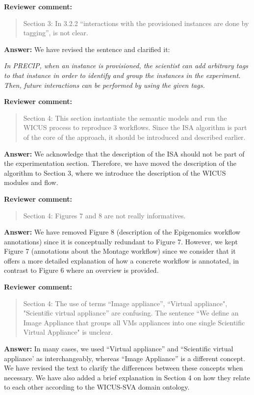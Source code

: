 \documentclass{letter}
\newenvironment{review}%
{\textbf{Reviewer comment:}\begin{quote}}%
{\end{quote}}%
\newcommand{\answer}[1]{%
      \textbf{Answer:} #1}
\newcommand{\revised}[1]{\emph{#1}\color{black}}
\begin{document}
\begin{letter}{}
\begin{review}
Section 3: In 3.2.2 ``interactions with the provisioned instances are done by tagging'', is not clear.
\end{review}

\answer{We have revised the sentence and clarified it:}

\revised{In PRECIP, when an instance is provisioned, the scientist can add arbitrary tags to that instance in order to identify and group the instances in the experiment. Then, future interactions can be performed by using the given tags.}


\begin{review}
Section 4: This section instantiate the semantic models and run the WICUS process to reproduce 3 workflows. Since the ISA algorithm is part of the core of the approach, it should be introduced and described earlier.
\end{review}

\answer{We acknowledge that the description of the ISA should not be part of the experimentation section. Therefore, we have moved the description of the algorithm to Section 3, where we introduce the description of the WICUS modules and flow.}


\begin{review}
Section 4: Figures 7 and 8 are not really informatives.
\end{review}

\answer{We have removed Figure 8 (description of the Epigenomics workflow annotations) since it is conceptually redundant to Figure 7. However, we kept Figure 7 (annotations about the Montage workflow) since we consider that it offers a more detailed explanation of how a concrete workflow is annotated, in contrast to Figure 6 where an overview is provided.}


\begin{review}
Section 4: The use of terms ``Image appliance'', ``Virtual appliance", "Scientific virtual appliance'' are confusing. The sentence ``We define an Image Appliance that groups all VMs appliances into one single Scientific Virtual Appliance" is unclear.
\end{review}

\answer{In many cases, we used ``Virtual appliance'' and ``Scientific virtual appliance' as interchangeably, whereas ``Image Appliance'' is a different concept. We have revised the text to clarify the differences between these concepts when necessary. We have also added a brief explanation in Section 4 on how they relate to each other according to the WICUS-SVA domain ontology.}



\end{letter}
\end{document}
